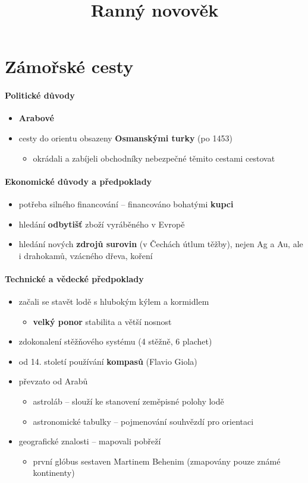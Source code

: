 \title{Ranný novověk}


\section{Zámořské cesty}
\paragraph{Politické důvody}
\begin{itemize}
\item \textbf{Arabové}
\item cesty do orientu obsazeny \textbf{Osmanskými turky} (po 1453)
	\begin{itemize}
	\item okrádali a zabíjeli obchodníky \ra nebezpečné těmito cestami cestovat
	\end{itemize}
\end{itemize}

\paragraph{Ekonomické důvody a předpoklady}
\begin{itemize}
\item potřeba silného financování -- financováno bohatými \textbf{kupci}
\item hledání \textbf{odbytišť} zboží vyráběného v Evropě
\item hledání nových \textbf{zdrojů surovin} (v Čechách útlum těžby), nejen Ag a Au, ale i drahokamů, vzácného dřeva, koření
\end{itemize}

\paragraph{Technické a vědecké předpoklady}
\begin{itemize}
\item začali se stavět lodě s hlubokým kýlem a kormidlem
	\begin{itemize}
	\item \textbf{velký ponor} \ra stabilita a větší nosnost
	\end{itemize}
\item zdokonalení stěžňového systému (4 stěžně, 6 plachet)
\item od 14. století používání \textbf{kompasů} (Flavio Giola)
\item převzato od Arabů
	\begin{itemize}
	\item astroláb -- slouží ke stanovení zeměpisné polohy lodě 
	\item astronomické tabulky -- pojmenování souhvězdí pro orientaci 
	\end{itemize}
\item geografické znalosti -- mapovali pobřeží
	\begin{itemize}
	\item první glóbus sestaven Martinem Behenim (zmapovány pouze známé kontinenty)
	\end{itemize}
\end{itemize}


